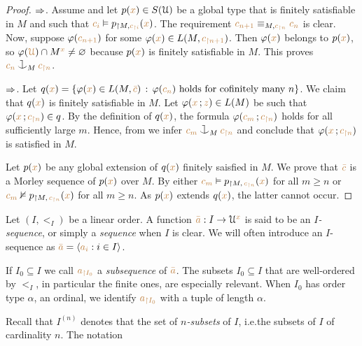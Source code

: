 \begin{proof}
$\Rightarrow$.
Assume  and let $p({\color{brown} x})\in S(\EuScript U)$ be a global type that is finitely satisfiable in $M$ and such that ${\color{brown} c_i}\vDash p_{\restriction M,{\color{brown} c_{\restriction i}}}({\color{brown} x})$.
The requirement ${\color{brown} c_{n+1}}\equiv_{M,{\color{brown} c_{\restriction n}}} {\color{brown} c_n}$ is clear.
Now, suppose $\varphi({\color{brown} c_{n+1}})$ for some $\varphi({\color{brown} x})\in L(M,{\color{brown} c_{\restriction n+1}})$.
Then $\varphi({\color{brown} x})$ belongs to $p({\color{brown} x})$, so $\varphi({\color{brown}\EuScript U})\cap M^{\color{brown} x}\neq\varnothing$ because $p({\color{brown} x})$ is finitely satisfiable in $M$.
This proves ${\mr c_n}\cnonfork_M{\mr c_{\restriction n}}$.

$\Rightarrow$.
Let $q({\color{brown} x})=\{\varphi({\color{brown} x})\in L(M, {\color{brown}\bar c})\,:\, \varphi({\color{brown} c_n}) \textrm{ holds for cofinitely many } n\}$.
%
We claim that $q({\color{brown} x})$ is finitely satisfiable in $M$.
%
Let $\varphi({\color{brown} x}\,;{\color{brown} z})\in L(M)$ be such that $\varphi({\color{brown} x}\,;{\color{brown} c_{\restriction n}})\in q$.
%
By the definition of $q({\color{brown} x})$, the formula $\varphi({\color{brown} c_m}\,;{\color{brown} c_{\restriction n}})$ holds for all sufficiently large $m$.
%
Hence, from  we infer ${\mr c_m}\cnonfork_M{\mr c_{\restriction n}}$ and conclude that $\varphi({\color{brown} x}\,;{\color{brown} c_{\restriction n}})$ is satisfied in $M$.

Let $p({\color{brown} x})$ be any global extension of $q({\color{brown} x})$ finitely saisfied in $M$.
%
We prove that ${\color{brown}\bar c}$ is a Morley sequence of $p({\color{brown} x})$ over $M$.
%
By  either ${\color{brown} c_m}\vDash p_{\restriction  M,\,{\color{brown} c_{\restriction n}}}({\color{brown} x})$ for all $m\ge n$ or ${\color{brown} c_m}\nvDash p_{\restriction  M,\,{\color{brown} c_{\restriction n}}}({\color{brown} x})$ for all $m\ge n$.
%
As $p({\color{brown} x})$ extends $q({\color{brown} x})$, the latter cannot occur.
\end{proof}

Let $(I,<_I)$ be a linear order.
A function ${\color{brown}\bar a}:I\to\EuScript U^{\color{brown} x}$ is said to be an \emph{$I$-sequence}, or simply a \emph{sequence\/} when $I$ is clear.
We will often introduce an $I$-sequence as ${\color{brown}\bar a}=\langle{\color{brown}a_i}: i\in I\rangle$.

If $I_0\subseteq I$ we call ${\color{brown} a_{\restriction I_0}}$ a \emph{subsequence\/} of ${\color{brown}\bar a}$.
The subsets $I_0\subseteq I$ that are well-ordered by $<_I$, in particular the finite ones, are especially relevant.
When $I_0$ has order type $\alpha$, an ordinal, we identify ${\color{brown} a_{\restriction I_0}}$ with a tuple of length $\alpha$.

Recall that \emph{$I^{(n)}$} denotes that the set of \emph{$n$-subsets\/} of $I$,  i.e.\@ the subsets of $I$ of cardinality $n$.
The notation \smallskip

